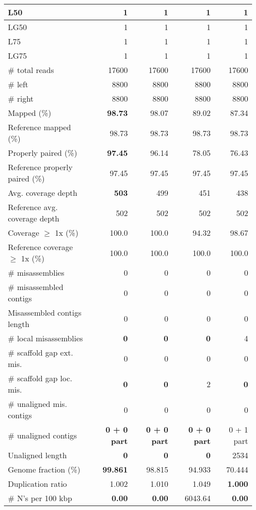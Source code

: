 \documentclass[12pt,a4paper]{article}
\begin{document}
\begin{table}[ht]
\begin{center}
\begin{tabular}{|l*{4}{|r}|}
L50 & 1 & 1 & 1 & 1 \\ \hline
LG50 & 1 & 1 & 1 & 1 \\ \hline
L75 & 1 & 1 & 1 & 1 \\ \hline
LG75 & 1 & 1 & 1 & 1 \\ \hline
\# total reads & 17600 & 17600 & 17600 & 17600 \\ \hline
\# left & 8800 & 8800 & 8800 & 8800 \\ \hline
\# right & 8800 & 8800 & 8800 & 8800 \\ \hline
Mapped (\%) & {\bf 98.73} & 98.07 & 89.02 & 87.34 \\ \hline
Reference mapped (\%) & 98.73 & 98.73 & 98.73 & 98.73 \\ \hline
Properly paired (\%) & {\bf 97.45} & 96.14 & 78.05 & 76.43 \\ \hline
Reference properly paired (\%) & 97.45 & 97.45 & 97.45 & 97.45 \\ \hline
Avg. coverage depth & {\bf 503} & 499 & 451 & 438 \\ \hline
Reference avg. coverage depth & 502 & 502 & 502 & 502 \\ \hline
Coverage $\geq$ 1x (\%) & 100.0 & 100.0 & 94.32 & 98.67 \\ \hline
Reference coverage $\geq$ 1x (\%) & 100.0 & 100.0 & 100.0 & 100.0 \\ \hline
\# misassemblies & 0 & 0 & 0 & 0 \\ \hline
\# misassembled contigs & 0 & 0 & 0 & 0 \\ \hline
Misassembled contigs length & 0 & 0 & 0 & 0 \\ \hline
\# local misassemblies & {\bf 0} & {\bf 0} & {\bf 0} & 4 \\ \hline
\# scaffold gap ext. mis. & 0 & 0 & 0 & 0 \\ \hline
\# scaffold gap loc. mis. & {\bf 0} & {\bf 0} & 2 & {\bf 0} \\ \hline
\# unaligned mis. contigs & 0 & 0 & 0 & 0 \\ \hline
\# unaligned contigs & {\bf 0 + 0 part} & {\bf 0 + 0 part} & {\bf 0 + 0 part} & 0 + 1 part \\ \hline
Unaligned length & {\bf 0} & {\bf 0} & {\bf 0} & 2534 \\ \hline
Genome fraction (\%) & {\bf 99.861} & 98.815 & 94.933 & 70.444 \\ \hline
Duplication ratio & 1.002 & 1.010 & 1.049 & {\bf 1.000} \\ \hline
\# N's per 100 kbp & {\bf 0.00} & {\bf 0.00} & 6043.64 & {\bf 0.00} \\ \hline

\end{tabular}
\end{center}
\end{table}
\end{document}
